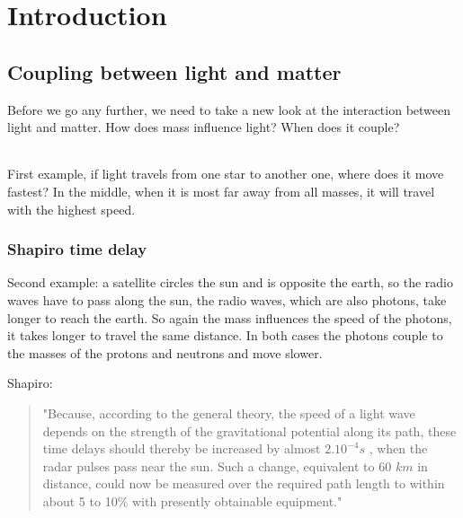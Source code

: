 \chapter{Introduction}


\section{Coupling between light and matter}
Before we go any further, we need to take a new look at the interaction between light and matter. How does mass influence light? When does it couple? 
\paragraph{}
\subparagraph{}
First example, if light travels from one star to another one, where does it move fastest? In the middle, when it is most far away from all masses, it will travel with the highest speed. 

\subsection{Shapiro time delay}
Second example: a satellite circles the sun and is opposite the earth, so the radio waves have to pass along the sun, the radio waves, which are also photons, take longer to reach the earth. So again the mass influences the speed of the photons, it takes longer to travel the same distance. In both cases the photons couple to the masses of the protons and neutrons and move slower. 

Shapiro:
\begin{quotation}

"Because, according to the general theory, the speed of a light wave depends on the strength of the gravitational potential along its path, these time delays should thereby be increased by almost $2.10^{-4}s$ , when the radar pulses pass near the sun. Such a change, equivalent to 60 $km$ in distance, could now be measured over the required path length to within about 5 to 10\% with presently obtainable equipment."

 \end{quotation}



